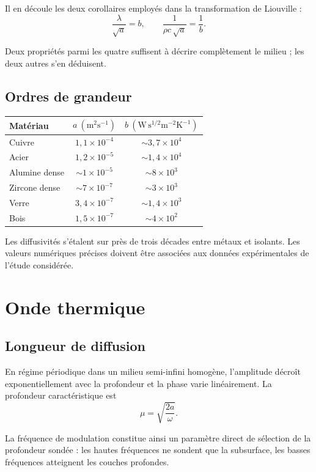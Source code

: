\documentclass[11pt,a4paper]{article}
\begin{document}
Il en découle les deux corollaires employés dans la transformation de Liouville :
\[ \frac{\lambda}{\sqrt{a}} = b , \qquad \frac{1}{\rho c\,\sqrt{a}} = \frac{1}{b} . \]

Deux propriétés parmi les quatre suffisent à décrire complètement le milieu ; les deux autres s'en
déduisent.

\subsection{Ordres de grandeur}

\begin{center}
\begin{tabular}{@{}lcc@{}}
\toprule
\textbf{Matériau} & $a\ (\mathrm{m^{2}s^{-1}})$ & $b\ (\mathrm{W\,s^{1/2}m^{-2}K^{-1}})$ \\
\midrule
Cuivre & $1{,}1\times10^{-4}$ & $\sim 3{,}7\times10^{4}$ \\
Acier & $1{,}2\times10^{-5}$ & $\sim 1{,}4\times10^{4}$ \\
Alumine dense & $\sim 1\times10^{-5}$ & $\sim 8\times10^{3}$ \\
Zircone dense & $\sim 7\times10^{-7}$ & $\sim 3\times10^{3}$ \\
Verre & $3{,}4\times10^{-7}$ & $\sim 1{,}4\times10^{3}$ \\
Bois & $1{,}5\times10^{-7}$ & $\sim 4\times10^{2}$ \\
\bottomrule
\end{tabular}
\end{center}

Les diffusivités s'étalent sur près de trois décades entre métaux et isolants. Les valeurs numériques
précises doivent être associées aux données expérimentales de l'étude considérée.

\section{Onde thermique}

\subsection{Longueur de diffusion}

En régime périodique dans un milieu semi-infini homogène, l'amplitude décroît exponentiellement avec la
profondeur et la phase varie linéairement. La profondeur caractéristique est
\[ \mu = \sqrt{\frac{2a}{\omega}} . \]

La fréquence de modulation constitue ainsi un paramètre direct de sélection de la profondeur sondée :
les hautes fréquences ne sondent que la subsurface, les basses fréquences atteignent les couches
profondes.
\end{document}
